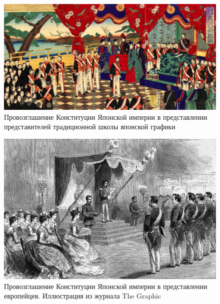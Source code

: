 \begin{figure}[h!tb] 
	\centering\includegraphics[scale=0.4]{Glava2/5jM5Gr9SNKY.jpg}
	\caption{Провозглашение Конституции Японской империи в представлении представителей традиционной школы японской графики}%
\end{figure}

\begin{figure}[h!tb] 
	\centering\includegraphics[scale=0.5]{Glava2/C6HfQOne0Bk.jpg}
	\caption{Провозглашение Конституции Японской империи в представлении европейцев. Иллюстрация из журнала The Graphic}%
\end{figure}

